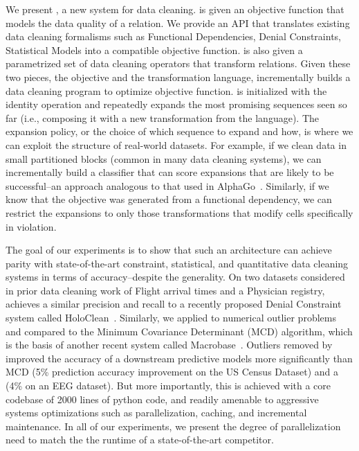 We present \sys, a new system for data cleaning.
\sys is given an objective function that models the data quality of a relation.
We provide an API that translates existing data cleaning formalisms such as Functional Dependencies, Denial Constraints, Statistical Models into a compatible objective function.
\sys is also given a parametrized set of data cleaning operators that transform relations.
Given these two pieces, the objective and the transformation language, \sys incrementally builds a data cleaning program to optimize objective function.
\sys is initialized with the identity operation and repeatedly expands the most promising sequences seen so far (i.e., composing it with a new transformation from the language).
The expansion policy, or the choice of which sequence to expand and how, is where we can exploit the structure of real-world datasets.
For example, if we clean data in small partitioned blocks (common in many data cleaning systems), we can incrementally build a classifier that can score expansions that are likely to be successful--an approach analogous to that used in AlphaGo~\cite{silver2016mastering}.
Similarly, if we know that the objective was generated from a functional dependency, we can restrict the expansions to only those transformations that modify cells specifically in violation. 

The goal of our experiments is to show that such an architecture can achieve parity with state-of-the-art constraint, statistical, and quantitative data cleaning systems in terms of accuracy--despite the generality.
On two datasets considered in prior data cleaning work of Flight arrival times and a Physician registry, \sys achieves a similar precision and recall to a recently proposed Denial Constraint system called HoloClean~\cite{rekatsinas2017holoclean}. 
Similarly, we applied \sys to numerical outlier problems and compared to the Minimum Covariance Determinant (MCD) algorithm, which is the basis of another recent system called Macrobase~\cite{bailis2016macrobase}.
Outliers removed by \sys  improved the accuracy of a downstream predictive models more significantly than MCD (5\% prediction accuracy improvement on the US Census Dataset) and a (4\% on an EEG dataset). 
But more importantly, this is achieved with a core codebase of 2000 lines of python code, and readily amenable to aggressive systems optimizations such as parallelization, caching, and incremental maintenance.
In all of our experiments, we present the degree of parallelization need to match the the runtime of a state-of-the-art competitor.

